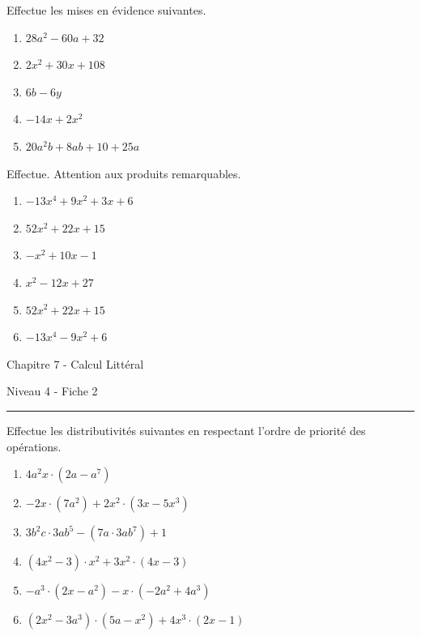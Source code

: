 \documentclass[12pt,parskip=half-, twoside=semi]{scrartcl}
\begin{document}
\begin{exercise}Effectue les mises en évidence suivantes.
  \begin{enumerate}[cols=2]
      \item $28a^2-60a+32$
      \item $2x^2+30x+108$
      \item $6b-6y$
      \item $-14x+2x^2$
      \item $20a^2b+8ab+10+25a$
  \end{enumerate}
\end{exercise}


\begin{exercise}Effectue. Attention aux produits remarquables.
  \begin{enumerate}
      \item $-13x^4+9x^2+3x+6$
      \item $52x^2+22x+15$
      \item $-x^2+10x-1$
      \item $x^2-12x+27$
      \item $52x^2+22x+15$
      \item $-13x^4-9x^2+6$
  \end{enumerate}
\end{exercise}

\newpage
\begin{center}
  \bfseries
  \begin{Huge}
    Chapitre 7 - Calcul Littéral
  \end{Huge}
  \smallbreak
  \begin{large}
    Niveau 4  - Fiche 2
  \end{large}
  \smallbreak
  \rule[10pt]{.5\linewidth}{1 pt}
\end{center}
 
\setcounter{exercise}{0}

\begin{exercise}Effectue les distributivités suivantes en respectant l'ordre de priorité des opérations.
  \begin{enumerate}[cols=2]
      \item $4 a^2 x \cdot\left(2 a-a^7\right)$
      \item $-2 x \cdot\left(7 a^2\right)+2 x^2 \cdot\left(3 x-5 x^3\right)$
      \item $3 b^2 c \cdot 3 a b^5-\left(7 a \cdot 3 a b^7\right)+1$ 
      \item $\left(4 x^2-3\right) \cdot x^2+3 x^2 \cdot(4 x-3)$
      \item $-a^3 \cdot\left(2 x-a^2\right)-x \cdot\left(-2 a^2+4 a^3\right)$
      \item $\left(2 x^2-3 a^3\right) \cdot\left(5 a-x^2\right)+4 x^3 \cdot(2 x-1)$
  \end{enumerate}
\end{exercise}
\end{document}
